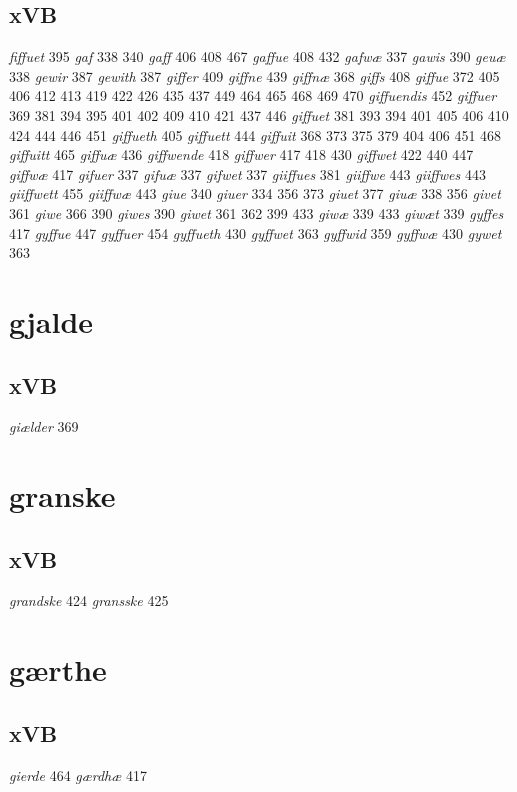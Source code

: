 \documentclass[a4paper,twocolumn]{article}
\begin{document}
\subsection{xVB}
\label{sec:org42d75a9}
\emph{fiffuet} 395 \emph{gaf} 338 340 \emph{gaff} 406 408 467 \emph{gaffue} 408 432 \emph{gafwæ} 337 \emph{gawis} 390 \emph{geuæ} 338 \emph{gewir} 387 \emph{gewith} 387 \emph{giffer} 409 \emph{giffne} 439 \emph{giffnæ} 368 \emph{giffs} 408 \emph{giffue} 372 405 406 412 413 419 422 426 435 437 449 464 465 468 469 470 \emph{giffuendis} 452 \emph{giffuer} 369 381 394 395 401 402 409 410 421 437 446 \emph{giffuet} 381 393 394 401 405 406 410 424 444 446 451 \emph{giffueth} 405 \emph{giffuett} 444 \emph{giffuit} 368 373 375 379 404 406 451 468 \emph{giffuitt} 465 \emph{giffuæ} 436 \emph{giffwende} 418 \emph{giffwer} 417 418 430 \emph{giffwet} 422 440 447 \emph{giffwæ} 417 \emph{gifuer} 337 \emph{gifuæ} 337 \emph{gifwet} 337 \emph{giiffues} 381 \emph{giiffwe} 443 \emph{giiffwes} 443 \emph{giiffwett} 455 \emph{giiffwæ} 443 \emph{giue} 340 \emph{giuer} 334 356 373 \emph{giuet} 377 \emph{giuæ} 338 356 \emph{givet} 361 \emph{giwe} 366 390 \emph{giwes} 390 \emph{giwet} 361 362 399 433 \emph{giwæ} 339 433 \emph{giwæt} 339 \emph{gyffes} 417 \emph{gyffue} 447 \emph{gyffuer} 454 \emph{gyffueth} 430 \emph{gyffwet} 363 \emph{gyffwid} 359 \emph{gyffwæ} 430 \emph{gywet} 363 
\section{gjalde}
\label{sec:orgff091a6}
\subsection{xVB}
\label{sec:org4730c12}
\emph{giælder} 369 
\section{granske}
\label{sec:org022468c}
\subsection{xVB}
\label{sec:orge13b6c1}
\emph{grandske} 424 \emph{gransske} 425 
\section{gærthe}
\label{sec:orgeb8a3a7}
\subsection{xVB}
\label{sec:org8b0e741}
\emph{gierde} 464 \emph{gærdhæ} 417 
\end{document}
